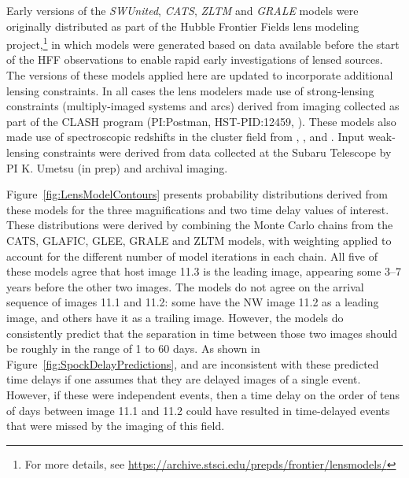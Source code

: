 Early versions of the {\it SWUnited}, {\it CATS}, {\it ZLTM} and {\it
  GRALE} models were originally distributed as part of the Hubble
Frontier Fields lens modeling project,\footnote{For more details, see
  \url{https://archive.stsci.edu/prepds/frontier/lensmodels/}} in
which models were generated based on data available before the start
of the HFF observations to enable rapid early investigations of lensed
sources. The versions of these models applied here are updated to
incorporate additional lensing constraints.  In all cases the lens
modelers made use of strong-lensing constraints (multiply-imaged
systems and arcs) derived from \HST imaging collected as part of the
CLASH program (PI:Postman, HST-PID:12459,
\citealt{Postman:2012}). These models also made use of spectroscopic
redshifts in the cluster field from \citet{Mann:2012},
\citet{Christensen:2012}, \citet{Grillo:2015} and
\citet{Caminha:2017}.  Input weak-lensing constraints were derived
from data collected at the Subaru Telescope by PI K. Umetsu (in prep)
and archival imaging.


Figure~\ref{fig:LensModelContours} presents probability distributions
derived from these models for the three magnifications and two time
delay values of interest.  These distributions were derived by
combining the Monte Carlo chains from the CATS, GLAFIC, GLEE, GRALE
and ZLTM models, with weighting applied to account for the different
number of model iterations in each chain. All five of these models
agree that host image 11.3 is the leading image, appearing some 3--7
years before the other two images.  The models do not agree on the
arrival sequence of images 11.1 and 11.2: some have the NW image 11.2
as a leading image, and others have it as a trailing image.  However,
the models do consistently predict that the separation in time between
those two images should be roughly in the range of 1 to 60 days. As
shown in Figure~\ref{fig:SpockDelayPredictions}, \spockone and
\spocktwo are inconsistent with these predicted time delays if one
assumes that they are delayed images of a single event.  However, if
these were independent events, then a time delay on the order of tens
of days between image 11.1 and 11.2 could have resulted in
time-delayed events that were missed by the \HST imaging of this
field.



